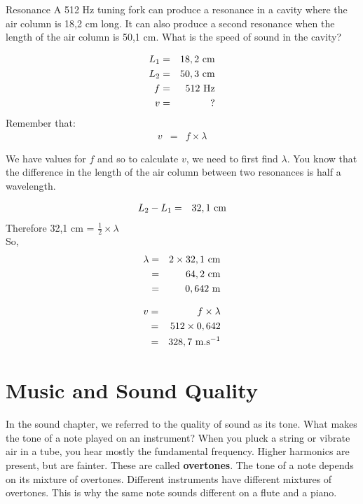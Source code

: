 \begin{wex}{Resonance}
{A 512 Hz tuning fork can produce a resonance in a cavity where the air column is 18,2 cm long. It can also produce
a second resonance when the length of the air column is 50,1 cm. What is the speed of sound in the cavity?}
{
\begin{eqnarray*}
L_{1} &=& 18,2 \ \rm{cm} \\
L_{2} &=& 50,3 \ \rm{cm} \\
f &=& 512 \ \rm{Hz} \\
v &=& ?
\end{eqnarray*}
Remember that:
\begin{eqnarray*}
v &=& f \times \lambda
\end{eqnarray*}

We have values for $f$ and so to calculate $v$, we need to first find $\lambda$.
You know that the difference in the length of the air column between two resonances is half a wavelength.

\begin{eqnarray*}
L_{2} - L_{1} &=& 32,1 \ \rm{cm}
\end{eqnarray*}
Therefore 32,1 cm = $\frac{1}{2}\times \lambda$\\
So,
\begin{eqnarray*}
\lambda &=& 2 \times 32,1 \ \rm{cm} \\
&=& 64,2 \ \rm{cm} \\
&=& 0,642 \ \rm{m}
\end{eqnarray*}

\begin{eqnarray*}
v &=& f \times \lambda \\
&=& 512 \times 0,642 \\
&=& 328,7 \ \rm{m.s}^{-1}
\end{eqnarray*}
}
\end{wex}

\section{Music and Sound Quality}
In the sound chapter, we referred to the quality of sound as its
tone.  What makes the tone of a note played on an instrument?
When you pluck a string or vibrate air in a tube, you hear mostly the fundamental frequency. Higher harmonics are present, but are fainter. These are called \textbf{overtones}.  The tone of a note depends on its mixture of overtones.  Different instruments have different
mixtures of overtones.  This is why the same note sounds
different on a flute and a piano.


